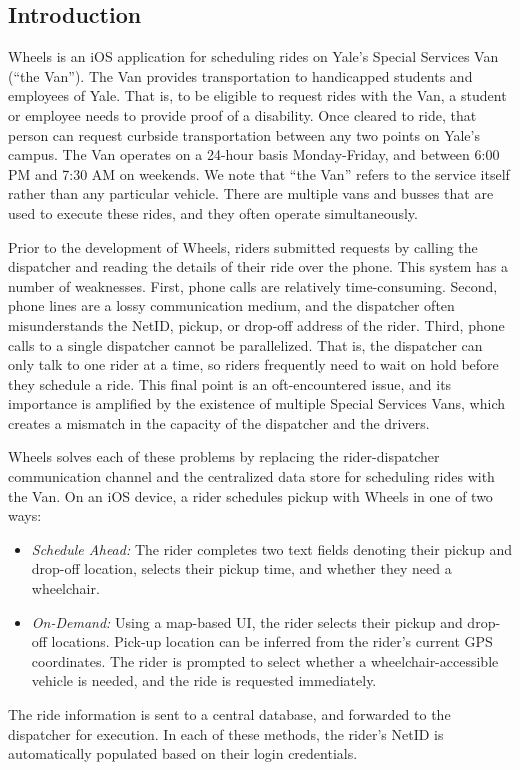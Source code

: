 \documentclass[12pt, a4paper]{article}
\begin{document}
\begin{multicols*}{2}
\section{Introduction}\label{sec:intro}
Wheels is an iOS application for scheduling rides on Yale's Special Services Van (``the Van''). The Van provides transportation to handicapped students and employees of Yale. That is, to be eligible to request rides with the Van, a student or employee needs to provide proof of a disability. Once cleared to ride, that person can request curbside transportation between any two points on Yale's campus. The Van operates on a 24-hour basis Monday-Friday, and between 6:00 PM and 7:30 AM on weekends. We note that ``the Van'' refers to the service itself rather than any particular vehicle. There are multiple vans and busses that are used to execute these rides, and they often operate simultaneously.

Prior to the development of Wheels, riders submitted requests by calling the dispatcher and reading the details of their ride over the phone. This system has a number of weaknesses. First, phone calls are relatively time-consuming. Second, phone lines are a lossy communication medium, and the dispatcher often misunderstands the NetID, pickup, or drop-off address of the rider. Third, phone calls to a single dispatcher cannot be parallelized. That is, the dispatcher can only talk to one rider at a time, so riders frequently need to wait on hold before they schedule a ride. This final point is an oft-encountered issue, and its importance is amplified by the existence of multiple Special Services Vans, which creates a mismatch in the capacity of the dispatcher and the drivers.

Wheels solves each of these problems by replacing the rider-dispatcher communication channel and the centralized data store for scheduling rides with the Van. On an iOS device, a rider schedules pickup with Wheels in one of two ways:
\begin{itemize}
	\item \textit{Schedule Ahead:} The rider completes two text fields denoting their pickup and drop-off location, selects their pickup time, and whether they need a wheelchair.
	\item \textit{On-Demand:} Using a map-based UI, the rider selects their pickup and drop-off locations. Pick-up location can be inferred from the rider's current GPS coordinates. The rider is prompted to select whether a wheelchair-accessible vehicle is needed, and the ride is requested immediately.
\end{itemize}
The ride information is sent to a central database, and forwarded to the dispatcher for execution. In each of these methods, the rider's NetID is automatically populated based on their login credentials.


\end{multicols*}
\end{document}
